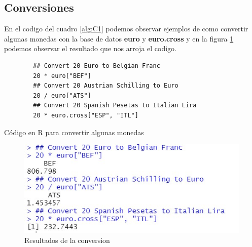 \documentclass[12pt,a4paper]{article}
\begin{document}
\subsection{Conversiones}
En el codigo del cuadro \ref{alg:C1} podemos observar ejemplos de como convertir algunas monedas con la base de datos \textbf{euro} y \textbf{euro.cross} y en la figura \ref{fig:R1} podemos observar el resultado que nos arroja el codigo. 
\begin{table}[htpb]
	\begin{lstlisting}
		## Convert 20 Euro to Belgian Franc
		20 * euro["BEF"]
		## Convert 20 Austrian Schilling to Euro
		20 / euro["ATS"]
		## Convert 20 Spanish Pesetas to Italian Lira
		20 * euro.cross["ESP", "ITL"]
	\end{lstlisting}
	\caption{Código en R para convertir algunas monedas}
	\label{alg:C1}
\end{table}
\begin{figure}
\centering
\includegraphics[scale=.8]{R1}
\caption{Resultados de la conversion}
\label{fig:R1}
\end{figure}
\newpage
\end{document}
